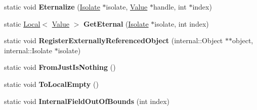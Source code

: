 \begin{DoxyCompactItemize}
\item 
static void {\bfseries Eternalize} (\hyperlink{classv8_1_1_isolate}{Isolate} $\ast$isolate, \hyperlink{classv8_1_1_value}{Value} $\ast$handle, int $\ast$index)\hypertarget{classv8_1_1_v8_a69451ec17e6d1ce0cdbc3b574e0d1e75}{}\label{classv8_1_1_v8_a69451ec17e6d1ce0cdbc3b574e0d1e75}

\item 
static \hyperlink{classv8_1_1_local}{Local}$<$ \hyperlink{classv8_1_1_value}{Value} $>$ {\bfseries Get\+Eternal} (\hyperlink{classv8_1_1_isolate}{Isolate} $\ast$isolate, int index)\hypertarget{classv8_1_1_v8_a4a9902a4fc284b40d87c20de82824344}{}\label{classv8_1_1_v8_a4a9902a4fc284b40d87c20de82824344}

\item 
static void {\bfseries Register\+Externally\+Referenced\+Object} (internal\+::\+Object $\ast$$\ast$object, internal\+::\+Isolate $\ast$isolate)\hypertarget{classv8_1_1_v8_a1be216245c08ab63649ed6f564fd6f9a}{}\label{classv8_1_1_v8_a1be216245c08ab63649ed6f564fd6f9a}

\item 
static void {\bfseries From\+Just\+Is\+Nothing} ()\hypertarget{classv8_1_1_v8_a342d54ee1d587474ab51e7e801d3f8c8}{}\label{classv8_1_1_v8_a342d54ee1d587474ab51e7e801d3f8c8}

\item 
static void {\bfseries To\+Local\+Empty} ()\hypertarget{classv8_1_1_v8_aa3437206d66894c105244a5f3aea812a}{}\label{classv8_1_1_v8_aa3437206d66894c105244a5f3aea812a}

\item 
static void {\bfseries Internal\+Field\+Out\+Of\+Bounds} (int index)\hypertarget{classv8_1_1_v8_a93784ec26025ebab8ae0297a3b457479}{}\label{classv8_1_1_v8_a93784ec26025ebab8ae0297a3b457479}

\end{DoxyCompactItemize}

